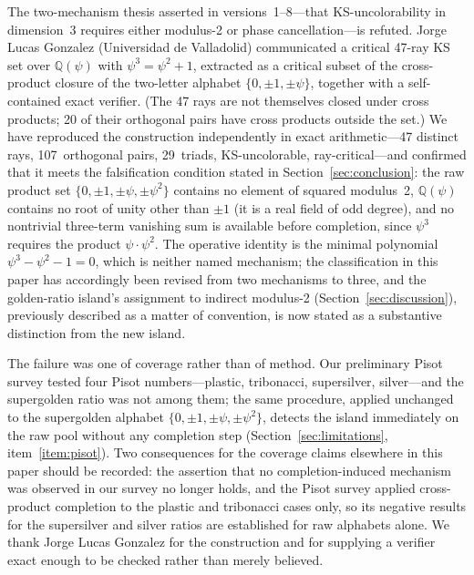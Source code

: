 \documentclass[12pt,a4paper]{article}
\newcommand{\Q}{\mathbb{Q}}
\begin{document}
\begin{sloppypar}
The two-mechanism thesis asserted in versions~1--8---that KS-uncolorability in dimension~3 requires either modulus-2 or phase cancellation---is refuted.  Jorge Lucas Gonzalez (Universidad de Valladolid) communicated a critical 47-ray KS set over $\Q(\psi)$ with $\psi^3 = \psi^2 + 1$, extracted as a critical subset of the cross-product closure of the two-letter alphabet $\{0, \pm 1, \pm\psi\}$, together with a self-contained exact verifier.  (The 47 rays are not themselves closed under cross products; 20 of their orthogonal pairs have cross products outside the set.)  We have reproduced the construction independently in exact arithmetic---47 distinct rays, 107~orthogonal pairs, 29~triads, KS-uncolorable, ray-critical---and confirmed that it meets the falsification condition stated in Section~\ref{sec:conclusion}: the raw product set $\{0, \pm 1, \pm\psi, \pm\psi^2\}$ contains no element of squared modulus~2, $\Q(\psi)$ contains no root of unity other than $\pm 1$ (it is a real field of odd degree), and no nontrivial three-term vanishing sum is available before completion, since $\psi^3$ requires the product $\psi \cdot \psi^2$.  The operative identity is the minimal polynomial $\psi^3 - \psi^2 - 1 = 0$, which is neither named mechanism; the classification in this paper has accordingly been revised from two mechanisms to three, and the golden-ratio island's assignment to indirect modulus-2 (Section~\ref{sec:discussion}), previously described as a matter of convention, is now stated as a substantive distinction from the new island.

The failure was one of coverage rather than of method.  Our preliminary Pisot survey tested four Pisot numbers---plastic, tribonacci, supersilver, silver---and the supergolden ratio was not among them; the same procedure, applied unchanged to the supergolden alphabet $\{0, \pm 1, \pm\psi, \pm\psi^2\}$, detects the island immediately on the raw pool without any completion step (Section~\ref{sec:limitations}, item~\ref{item:pisot}).  Two consequences for the coverage claims elsewhere in this paper should be recorded: the assertion that no completion-induced mechanism was observed in our survey no longer holds, and the Pisot survey applied cross-product completion to the plastic and tribonacci cases only, so its negative results for the supersilver and silver ratios are established for raw alphabets alone.  We thank Jorge Lucas Gonzalez for the construction and for supplying a verifier exact enough to be checked rather than merely believed.
\end{sloppypar}
\end{document}
